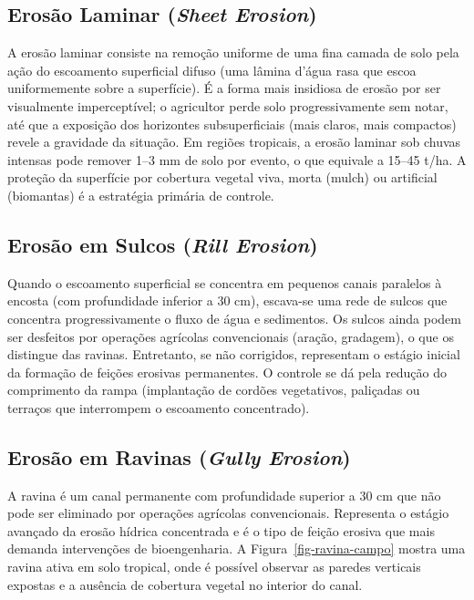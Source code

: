 \documentclass[
  portuguese,
  11pt,
  a4paper,
  open=any]{scrbook}
\begin{document}
\subsection{\texorpdfstring{Erosão Laminar (\emph{Sheet
Erosion})}{Erosão Laminar (Sheet Erosion)}}\label{erosuxe3o-laminar-sheet-erosion}

A erosão laminar consiste na remoção uniforme de uma fina camada de solo
pela ação do escoamento superficial difuso (uma lâmina d'água rasa que
escoa uniformemente sobre a superfície). É a forma mais insidiosa de
erosão por ser visualmente imperceptível; o agricultor perde solo
progressivamente sem notar, até que a exposição dos horizontes
subsuperficiais (mais claros, mais compactos) revele a gravidade da
situação. Em regiões tropicais, a erosão laminar sob chuvas intensas
pode remover 1--3 mm de solo por evento, o que equivale a 15--45 t/ha. A
proteção da superfície por cobertura vegetal viva, morta (mulch) ou
artificial (biomantas) é a estratégia primária de controle.

\subsection{\texorpdfstring{Erosão em Sulcos (\emph{Rill
Erosion})}{Erosão em Sulcos (Rill Erosion)}}\label{erosuxe3o-em-sulcos-rill-erosion}

Quando o escoamento superficial se concentra em pequenos canais
paralelos à encosta (com profundidade inferior a 30 cm), escava-se uma
rede de sulcos que concentra progressivamente o fluxo de água e
sedimentos. Os sulcos ainda podem ser desfeitos por operações agrícolas
convencionais (aração, gradagem), o que os distingue das ravinas.
Entretanto, se não corrigidos, representam o estágio inicial da formação
de feições erosivas permanentes. O controle se dá pela redução do
comprimento da rampa (implantação de cordões vegetativos, paliçadas ou
terraços que interrompem o escoamento concentrado).

\subsection{\texorpdfstring{Erosão em Ravinas (\emph{Gully
Erosion})}{Erosão em Ravinas (Gully Erosion)}}\label{erosuxe3o-em-ravinas-gully-erosion}

A ravina é um canal permanente com profundidade superior a 30 cm que não
pode ser eliminado por operações agrícolas convencionais. Representa o
estágio avançado da erosão hídrica concentrada e é o tipo de feição
erosiva que mais demanda intervenções de bioengenharia. A
Figura~\ref{fig-ravina-campo} mostra uma ravina ativa em solo tropical,
onde é possível observar as paredes verticais expostas e a ausência de
cobertura vegetal no interior do canal.
\end{document}
